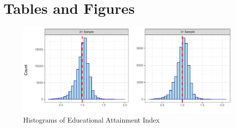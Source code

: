 \documentclass[11pt,a4paper]{article}
\begin{document}
\begin{onehalfspace}





\printbibliography

\end{onehalfspace}

\newpage
\section*{Tables and Figures}

\begin{figure}[h!]
\centering
\caption{\label{fig:01}Histograms of Educational Attainment Index}
\includegraphics[width=\textwidth]{figures/hists.pdf}
\end{figure}
\end{document}

